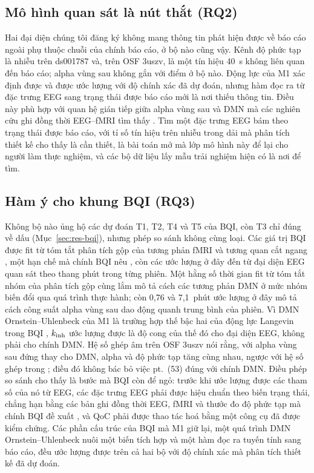 \subsection{Mô hình quan sát là nút thắt (RQ2)}
Hai đại diện chúng tôi đăng ký không mang thông tin phát hiện được về báo cáo ngoài phụ thuộc chuỗi của chính báo cáo, ở bộ nào cũng vậy. Kênh độ phức tạp là nhiễu trên ds001787 và, trên OSF 3uszv, là một tín hiệu 40~s không liên quan đến báo cáo; alpha vùng sau không gắn với điểm ở bộ nào. Động lực của M1 xác định được và được ước lượng với độ chính xác đã dự đoán, nhưng hàm đọc ra từ đặc trưng EEG sang trạng thái được báo cáo mới là nơi thiếu thông tin. Điều này phù hợp với quan hệ gián tiếp giữa alpha vùng sau và DMN mà các nghiên cứu ghi đồng thời EEG--fMRI tìm thấy \cite{Laufs2003,Mantini2007}. Tìm một đặc trưng EEG bám theo trạng thái được báo cáo, với tỉ số tín hiệu trên nhiễu trong dải mà phân tích thiết kế cho thấy là cần thiết, là bài toán mở mà lớp mô hình này để lại cho người làm thực nghiệm, và các bộ dữ liệu lấy mẫu trải nghiệm hiện có \cite{Weinstein2018,Brandmeyer2018,RodriguezLarios2021} là nơi để tìm.

\subsection{Hàm ý cho khung BQI (RQ3)}
Không bộ nào ủng hộ các dự đoán T1, T2, T4 và T5 của BQI, còn T3 chỉ đúng về dấu (Mục~\ref{sec:res-bqi}), nhưng phép so sánh không cùng loại. Các giá trị BQI được fit từ tóm tắt phân tích gộp của tương phản fMRI và tương quan cắt ngang \cite[Mục~7.2--7.5]{BQI}, một hạn chế mà chính BQI nêu \cite[Mục~11.3]{BQI}, còn các ước lượng ở đây đến từ đại diện EEG quan sát theo thang phút trong từng phiên. Một hằng số thời gian fit từ tóm tắt nhóm của phân tích gộp cùng lắm mô tả cách các tương phản DMN ở mức nhóm biến đổi qua quá trình thực hành; còn 0,76 và 7,1~phút ước lượng ở đây mô tả cách công suất alpha vùng sau dao động quanh trung bình của phiên. Vì DMN Ornstein--Uhlenbeck của M1 là trường hợp thế bậc hai của động lực Langevin trong BQI \cite[pt.~(83)--(87)]{BQI}, $k_{\mathrm{inh}}$ ước lượng được là độ cong của thế đó cho đại diện EEG, không phải cho chính DMN. Hệ số ghép âm trên OSF 3uszv nói rằng, với alpha vùng sau đứng thay cho DMN, alpha và độ phức tạp tăng cùng nhau, ngược với hệ số ghép trong \cite[pt.~(53)]{BQI}; điều đó không bác bỏ việc pt.~(53) đúng với chính DMN. Điều phép so sánh cho thấy là bước mà BQI còn để ngỏ: trước khi ước lượng được các tham số của nó từ EEG, các đặc trưng EEG phải được hiệu chuẩn theo biến trạng thái, chẳng hạn bằng các bản ghi đồng thời EEG, fMRI và thước đo độ phức tạp mà chính BQI đề xuất \cite[Mục~14]{BQI}, và QoC phải được thao tác hoá bằng một công cụ đã được kiểm chứng. Các phần cấu trúc của BQI mà M1 giữ lại, một quá trình DMN Ornstein--Uhlenbeck nuôi một biến tích hợp và một hàm đọc ra tuyến tính sang báo cáo, đều ước lượng được trên cả hai bộ với độ chính xác mà phân tích thiết kế đã dự đoán.

